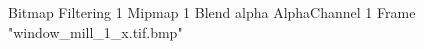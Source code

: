 {Bitmap
	{Filtering 1}
	{Mipmap 1}
	{Blend alpha}
	{AlphaChannel 1}
	{Frame "window_mill_1_x.tif.bmp"}
}
